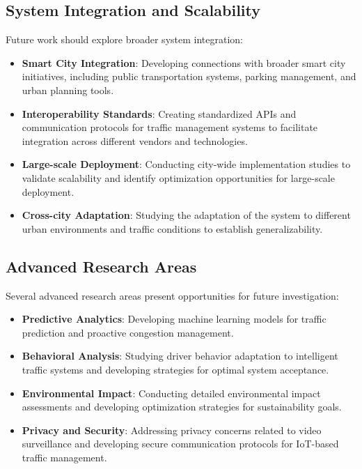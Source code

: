 \subsection{System Integration and Scalability}
Future work should explore broader system integration:

\begin{itemize}
    \item \textbf{Smart City Integration}: Developing connections with broader smart city initiatives, including public transportation systems, parking management, and urban planning tools.
    
    \item \textbf{Interoperability Standards}: Creating standardized APIs and communication protocols for traffic management systems to facilitate integration across different vendors and technologies.
    
    \item \textbf{Large-scale Deployment}: Conducting city-wide implementation studies to validate scalability and identify optimization opportunities for large-scale deployment.
    
    \item \textbf{Cross-city Adaptation}: Studying the adaptation of the system to different urban environments and traffic conditions to establish generalizability.
\end{itemize}

\subsection{Advanced Research Areas}
Several advanced research areas present opportunities for future investigation:

\begin{itemize}
    \item \textbf{Predictive Analytics}: Developing machine learning models for traffic prediction and proactive congestion management.
    
    \item \textbf{Behavioral Analysis}: Studying driver behavior adaptation to intelligent traffic systems and developing strategies for optimal system acceptance.
    
    \item \textbf{Environmental Impact}: Conducting detailed environmental impact assessments and developing optimization strategies for sustainability goals.
    
    \item \textbf{Privacy and Security}: Addressing privacy concerns related to video surveillance and developing secure communication protocols for IoT-based traffic management.
\end{itemize}

